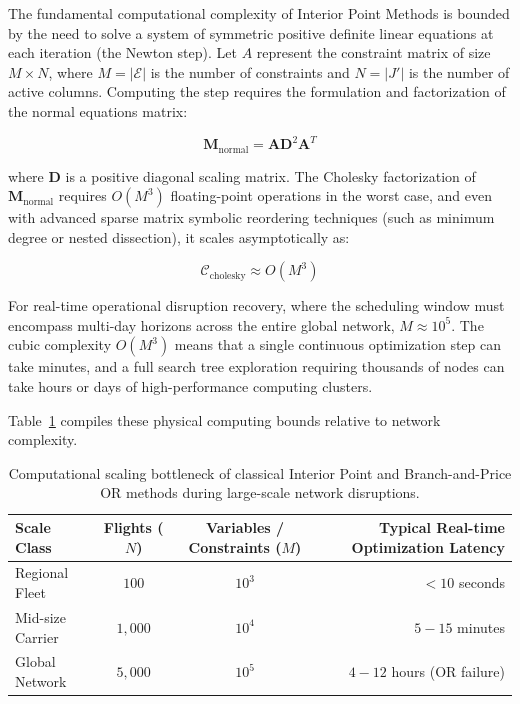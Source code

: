 \documentclass[11pt,a4paper]{book}
\begin{document}
The fundamental computational complexity of Interior Point Methods is bounded by the need to solve a system of symmetric positive definite linear equations at each iteration (the Newton step). Let $A$ represent the constraint matrix of size $M \times N$, where $M = |\mathcal{E}|$ is the number of constraints and $N = |J'| $ is the number of active columns. Computing the step requires the formulation and factorization of the normal equations matrix:

\begin{equation}
\mathbf{M}_{\text{normal}} = \mathbf{A} \mathbf{D}^2 \mathbf{A}^T
\end{equation}

where $\mathbf{D}$ is a positive diagonal scaling matrix. The Cholesky factorization of $\mathbf{M}_{\text{normal}}$ requires $O(M^3)$ floating-point operations in the worst case, and even with advanced sparse matrix symbolic reordering techniques (such as minimum degree or nested dissection), it scales asymptotically as:

\begin{equation}
\mathcal{C}_{\text{cholesky}} \approx O\left(M^3\right)
\end{equation}

For real-time operational disruption recovery, where the scheduling window must encompass multi-day horizons across the entire global network, $M \approx 10^5$. The cubic complexity $O(M^3)$ means that a single continuous optimization step can take minutes, and a full search tree exploration requiring thousands of nodes can take hours or days of high-performance computing clusters.

Table~\ref{table:or_limits} compiles these physical computing bounds relative to network complexity.

\begin{table}[h!]
\centering
\begin{tabular}{|l|c|c|r|}
\hline
\textbf{Scale Class} & \textbf{Flights ($N$)} & \textbf{Variables / Constraints ($M$)} & \textbf{Typical Real-time Optimization Latency} \\ \hline
Regional Fleet & $100$ & $10^3$ & $< 10$ seconds \\ \hline
Mid-size Carrier & $1,000$ & $10^4$ & $5 - 15$ minutes \\ \hline
Global Network & $5,000$ & $10^5$ & $4 - 12$ hours (OR failure) \\ \hline
\end{tabular}
\caption{Computational scaling bottleneck of classical Interior Point and Branch-and-Price OR methods during large-scale network disruptions.}
\label{table:or_limits}
\end{table}
\end{document}
